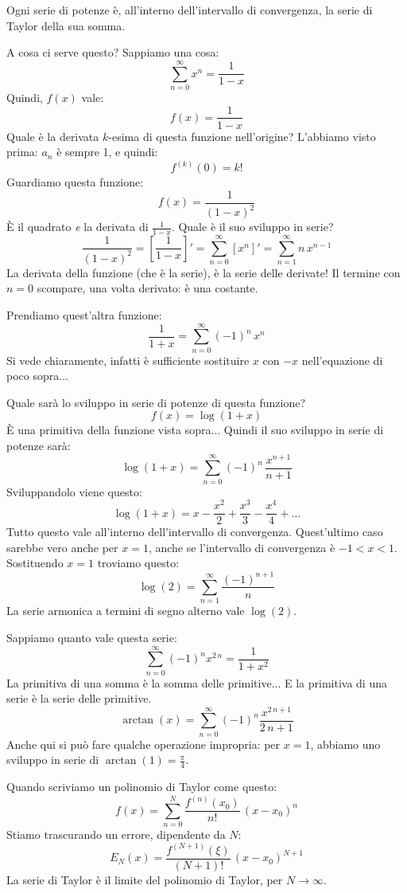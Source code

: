Ogni serie di potenze \`e, all'interno dell'intervallo di convergenza, la serie di Taylor della sua somma.

A cosa ci serve questo? Sappiamo una cosa:
\[
\sum_{n = 0}^{\infty} x^n = \frac{1}{1 - x}
\]
Quindi, $f(x)$ vale:
\[
f(x) = \frac{1}{1 - x}
\]
Quale \`e la derivata $k$-esima di questa funzione nell'origine? L'abbiamo visto prima: $a_n$ \`e sempre 1, e quindi:
\[
f^{(k)} (0) = k!
\]
Guardiamo questa funzione:
\[
f(x) = \frac{1}{(1 - x)^2}
\]
\`E il quadrato \emph{e} la derivata di $\frac{1}{1 - x}$. Quale \`e il suo sviluppo in serie?
\[
\frac{1}{(1 - x)^2} = \left[ \frac{1}{1 - x} \right]' = 
\sum_{n = 0}^{\infty} \left[ x^{n} \right]' = \sum_{n = 1}^{\infty} n \, x^{n - 1}
\]
La derivata della funzione (che \`e la serie), \`e la serie delle derivate! Il termine con $n = 0$ scompare, una volta derivato: \`e una costante.

Prendiamo quest'altra funzione:
\[
\frac{1}{1 + x} = \sum_{n = 0}^{\infty} (-1)^n \, x^n
\]
Si vede chiaramente, infatti \`e sufficiente sostituire $x$ con $-x$ nell'equazione di poco sopra...

Quale sar\`a lo sviluppo in serie di potenze di questa funzione?
\[
f(x) = \log (1 + x)
\]
\`E una primitiva della funzione vista sopra... Quindi il suo sviluppo in serie di potenze sar\`a:
\[
\log (1 + x) = \sum_{n = 0}^{\infty} (-1)^n \, \frac{x^{n+1}}{n+1}
\]
Sviluppandolo viene questo:
\[
\log (1 + x) = x - \frac{x^2}{2} + \frac{x^3}{3} - \frac{x^4}{4} + \ldots
\]
Tutto questo vale all'interno dell'intervallo di convergenza. Quest'ultimo caso sarebbe vero anche per $x = 1$, anche se l'intervallo di convergenza \`e $-1 < x < 1$. Sostituendo $x = 1$ troviamo questo:
\[
\log (2) = \sum_{n = 1}^{\infty} \frac{(-1)^{n+1}}{n}
\]
La serie armonica a termini di segno alterno vale $\log (2)$.

Sappiamo quanto vale questa serie:
\[
\sum_{n = 0}^{\infty} (-1)^n x^{2 \, n} = \frac{1}{1 + x^2}
\]
La primitiva di una somma \`e la somma delle primitive... E la primitiva di una serie \`e la serie delle primitive.
\[
\arctan (x) = \sum_{n = 0}^{\infty} (-1)^n \frac{x^{2 \, n + 1}}{2 \, n + 1}
\]
Anche qui si pu\`o fare qualche operazione impropria: per $x = 1$, abbiamo uno sviluppo in serie di $\arctan (1) = \frac{\pi}{4}$.

Quando scriviamo un polinomio di Taylor come questo:
\[
f(x) = \sum_{n = 0}^{N} \frac{f^{(n)} (x_0)}{n!} \, (x - x_0)^n
\]
Stiamo trascurando un errore, dipendente da $N$:
\[
E_N (x) = \frac{f^{(N + 1)} (\xi)}{(N + 1)!} \, (x - x_0)^{N + 1}
\]
La serie di Taylor \`e il limite del polinomio di Taylor, per $N \to \infty$.

